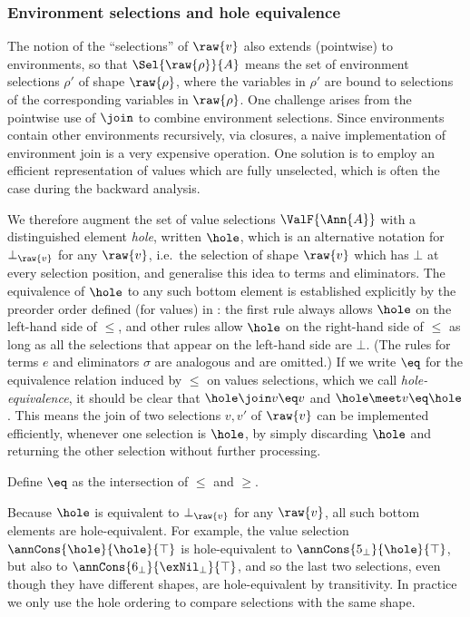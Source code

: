 \subsubsection{Environment selections and hole equivalence}

The notion of the ``selections'' of $\raw{v}$ also extends (pointwise) to environments, so that $\Sel{\raw{\rho}}{A}$ means the set of environment selections $\rho'$ of shape $\raw{\rho}$, where the variables in $\rho'$ are bound to selections of the corresponding variables in $\raw{\rho}$. One challenge arises from the pointwise use of $\join$ to combine environment selections. Since environments contain other environments recursively, via closures, a naive implementation of environment join is a very expensive operation. One solution is to employ an efficient representation of values which are fully unselected, which is often the case during the backward analysis.

We therefore augment the set of value selections $\ValF{\Ann{A}}$ with a distinguished element \emph{hole}, written $\hole$, which is an alternative notation for $\bot_{\raw{v}}$ for any $\raw{v}$, i.e.~the selection of shape $\raw{v}$ which has $\bot$ at every selection position, and generalise this idea to terms and eliminators. The equivalence of $\hole$ to any such bottom element is established explicitly by the preorder order defined (for values) in : the first rule always allows $\hole$ on the left-hand side of $\leq$, and other rules allow $\hole$ on the right-hand side of $\leq$ as long as all the selections that appear on the left-hand side are $\bot$. (The rules for terms $e$ and eliminators $\sigma$ are analogous and are omitted.) If we write $\eq$ for the equivalence relation induced by $\leq$ on values selections, which we call \emph{hole-equivalence}, it should be clear that $\hole \join v \eq v$ and $\hole \meet v \eq \hole$. This means the join of two selections $v, v'$ of $\raw{v}$ can be implemented efficiently, whenever one selection is $\hole$, by simply discarding $\hole$ and returning the other selection without further processing.

\begin{definition}
   Define $\eq$ as the intersection of $\leq$ and $\geq$.
\end{definition}

Because $\hole$ is equivalent to $\bot_{\raw{v}}$ for any $\raw{v}$, all such bottom elements are hole-equivalent. For example, the value selection $\annCons{\hole}{\hole}{\top}$ is hole-equivalent to $\annCons{5_{\bot}}{\hole}{\top}$, but also to $\annCons{6_{\bot}}{{\exNil_{\bot}}}{\top}$, and so the last two selections, even though they have different shapes, are hole-equivalent by transitivity. In practice we only use the hole ordering to compare selections with the same shape.

